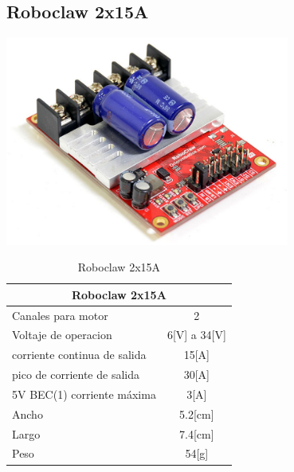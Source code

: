 \documentclass[a4paper]{book}
\begin{document}
\subsection{Roboclaw 2x15A}

\begin{center}
\includegraphics[width=0.7\textwidth]{Figures/Hardware/Partes/Roboclaw_2x15A.png}
\label{fig:Hardware:Partes:Roboclaw:2x15A}
\end{center}

\begin{table}[H]
\begin{center}
\begin{tabular}{|l|l|}%


\hline
\multicolumn{2}{|c|}{Roboclaw 2x15A} \\ \hline %
Canales para motor & \multicolumn{1}{|c|}{2}\\ \hline
Voltaje de operacion & \multicolumn{1}{|c|}{6[V] a 34[V]}\\ \hline
corriente continua de salida & \multicolumn{1}{|c|}{15[A]}\\ \hline
pico de corriente de salida & \multicolumn{1}{|c|}{30[A]}\\ \hline
5V BEC(1) corriente máxima & \multicolumn{1}{|c|}{3[A]}\\ \hline
Ancho & \multicolumn{1}{|c|}{5.2[cm]}\\ \hline
Largo & \multicolumn{1}{|c|}{7.4[cm]}\\ \hline
Peso & \multicolumn{1}{|c|}{54[g]}\\ \hline

\end{tabular}
\caption{Roboclaw 2x15A}
\label{Datos del Roboclaw}
\end{center}
\end{table}
\end{document}
